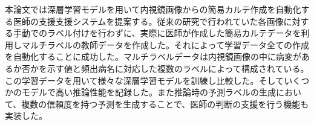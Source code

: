 本論文では深層学習モデルを用いて内視鏡画像からの簡易カルテ作成を自動化する医師の支援支援システムを提案する。従来の研究で行われていた各画像に対する手動でのラベル付けを行わずに、実際に医師が作成した簡易カルテデータを利用しマルチラベルの教師データを作成した。それによって学習データ全ての作成を自動化することに成功した。マルチラベルデータは内視鏡画像の中に病変があるか否かを示す値と頻出病名に対応した複数のラベルによって構成されている。この学習データを用いて様々な深層学習モデルを訓練し比較した。そしていくつかのモデルで高い推論性能を記録した。また推論時の予測ラベルの生成において、複数の信頼度を持つ予測を生成することで、医師の判断の支援を行う機能も実装した。
